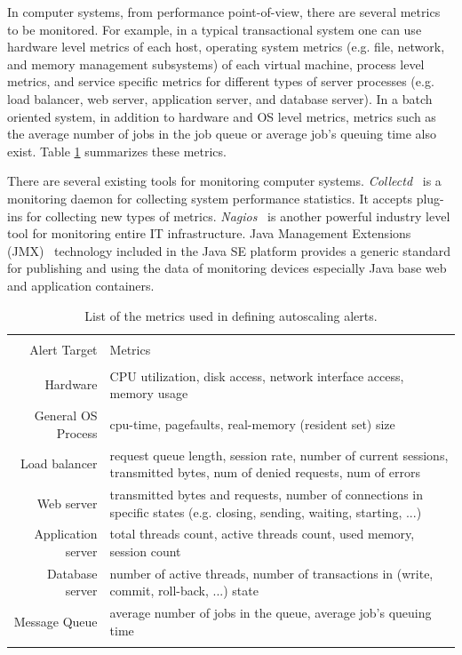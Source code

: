 In computer systems, from performance point-of-view, there are several metrics to be monitored.
For example, in a typical transactional system one can use hardware level metrics of each host, 
operating system metrics (e.g. file, network, and memory management subsystems) of each virtual machine, 
process level metrics, and service specific metrics for different types of server processes (e.g. load balancer, web server, application server, and database server). 
In a batch oriented system, in addition to hardware and OS level metrics, metrics such as the average number of jobs in the job queue or average job's queuing time also exist.  
Table \ref{tab:alerts-metrics} summarizes these metrics.

There are several existing tools for monitoring computer systems.
\textit{Collectd}~\cite{collectd} is a monitoring daemon for collecting system performance statistics. It accepts plug-ins for collecting new types of metrics.
\textit{Nagios}~\cite{nagios} is another powerful industry level tool for monitoring entire IT infrastructure.
Java Management Extensions (JMX)~\cite{jmx} technology included in the Java SE platform provides a generic standard for publishing and using the data of monitoring devices especially Java base web and application containers. 

\begin{table}[h]
    \centering
    \begin{tabularx}{\linewidth}{ r X }
    \hline \\
    Alert Target & Metrics \\ \hline \\
    Hardware & CPU utilization, disk access, network interface access, memory usage \\
    General OS Process & cpu-time, pagefaults, real-memory (resident set) size \\
    Load balancer & request queue length, session rate, number of current  sessions, transmitted bytes, num of denied requests, num of errors \\
    Web server & transmitted bytes and requests, number of connections in specific states (e.g. closing, sending, waiting, starting, ...) \\
    Application server & total threads count, active threads count, used memory, session count \\
    Database server & number of active threads, number of transactions in (write, commit, roll-back, ...) state \\
    Message Queue & average number of jobs in the queue, average job's queuing time \\
    \hline \\
    \end{tabularx}
  \caption{List of the metrics used in defining autoscaling alerts.}
  \label{tab:alerts-metrics}
\end{table}


